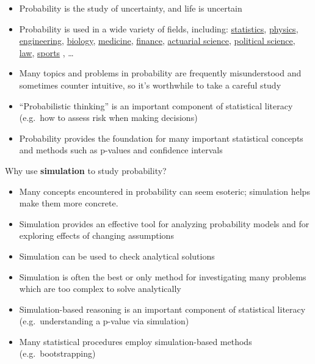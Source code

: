 \documentclass[
]{book}
\providecommand{\tightlist}{%
  \setlength{\itemsep}{0pt}\setlength{\parskip}{0pt}}
\theoremstyle{definition}
\theoremstyle{definition}
\theoremstyle{definition}
\theoremstyle{remark}
\begin{document}
\begin{itemize}
\tightlist
\item
  Probability is the study of uncertainty, and life is uncertain
\item
  Probability is used in a wide variety of fields, including: \href{https://fivethirtyeight.com/features/not-even-scientists-can-easily-explain-p-values/}{statistics}, \href{https://www.ucdavis.edu/news/does-probability-come-quantum-physics/}{physics}, \href{https://en.wikipedia.org/wiki/Signal_processing}{engineering}, \href{https://www.ncbi.nlm.nih.gov/pmc/articles/PMC3843941/}{biology}, \href{https://cvi.asm.org/content/cdli/23/4/249.full.pdf}{medicine}, \href{https://www.marketwatch.com/story/the-4-called-the-last-financial-crisis-heres-what-they-see-causing-the-next-one-2018-09-13}{finance}, \href{https://www.ssa.gov/oact/STATS/table4c6.html}{actuarial science}, \href{https://projects.fivethirtyeight.com/2016-election-forecast/}{political science}, \href{https://en.wikipedia.org/wiki/Prosecutor\%27s_fallacy}{law}, \href{https://www.numberfire.com/nfl/lists/18685/the-10-biggest-plays-of-super-bowl-lii}{sports} , \ldots{}
\item
  Many topics and problems in probability are frequently misunderstood and sometimes counter intuitive, so it's worthwhile to take a careful study
\item
  ``Probabilistic thinking'' is an important component of statistical literacy (e.g.~how to assess risk when making decisions)
\item
  Probability provides the foundation for many important statistical concepts and methods such as p-values and confidence intervals
\end{itemize}

Why use \textbf{simulation} to study probability?

\begin{itemize}
\tightlist
\item
  Many concepts encountered in probability can seem esoteric; simulation helps make them more concrete.
\item
  Simulation provides an effective tool for analyzing probability models and for exploring effects of changing assumptions
\item
  Simulation can be used to check analytical solutions
\item
  Simulation is often the best or only method for investigating many problems which are too complex to solve analytically
\item
  Simulation-based reasoning is an important component of statistical literacy (e.g.~understanding a p-value via simulation)
\item
  Many statistical procedures employ simulation-based methods (e.g.~bootstrapping)
\end{itemize}
\end{document}
